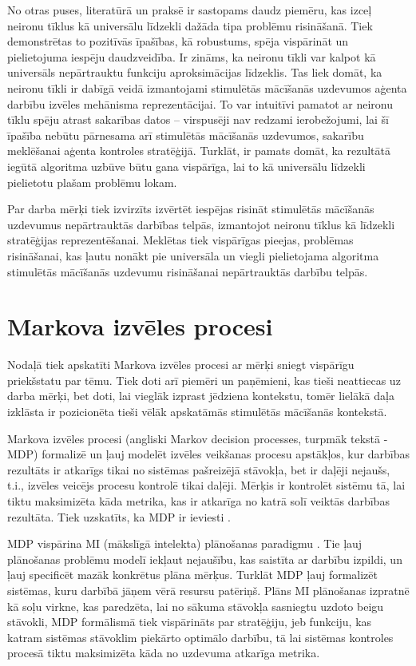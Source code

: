 \documentclass{ludis} %
\begin{document}
No otras puses, literatūrā un praksē ir sastopams daudz piemēru, kas izceļ neironu tīklus kā universālu līdzekli dažāda tipa problēmu risināšanā.
Tiek demonstrētas to pozitīvās īpašības, kā robustums, spēja vispārināt un pielietojuma iespēju daudzveidība.
Ir zināms, ka neironu tīkli var kalpot kā universāls nepārtrauktu funkciju aproksimācijas līdzeklis.
Tas liek domāt, ka neironu tīkli ir dabīgā veidā izmantojami stimulētās mācīšanās uzdevumos aģenta darbību izvēles mehānisma reprezentācijai.
To var intuitīvi pamatot ar neironu tīklu spēju atrast sakarības datos -- virspusēji nav redzami ierobežojumi, lai šī īpašība nebūtu pārnesama arī stimulētās mācīšanās uzdevumos, sakarību meklēšanai aģenta kontroles stratēģijā.
Turklāt, ir pamats domāt, ka rezultātā iegūtā algoritma uzbūve būtu gana vispārīga, lai to kā universālu līdzekli pielietotu plašam problēmu lokam.

Par darba mērķi tiek izvirzīts izvērtēt iespējas risināt stimulētās mācīšanās uzdevumus nepārtrauktās darbības telpās, izmantojot neironu tīklus kā līdzekli stratēģijas reprezentēšanai.
Meklētas tiek vispārīgas pieejas, problēmas risināšanai, kas ļautu nonākt pie universāla un viegli pielietojama algoritma stimulētās mācīšanās uzdevumu risināšanai nepārtrauktās darbību telpās.

\chapter{Markova izvēles procesi} \label{chap:mdp}
Nodaļā tiek apskatīti Markova izvēles procesi ar mērķi sniegt vispārīgu priekšstatu par tēmu.
Tiek doti arī piemēri un paņēmieni, kas tieši neattiecas uz darba mērķi, bet doti, lai vieglāk izprast jēdziena kontekstu, tomēr lielākā daļa izklāsta ir pozicionēta tieši vēlāk apskatāmās stimulētās mācīšanās kontekstā.

Markova izvēles procesi (angliski Markov decision processes, turpmāk tekstā - MDP) formalizē un ļauj modelēt izvēles veikšanas procesu apstākļos, kur darbības rezultāts ir atkarīgs tikai no sistēmas pašreizējā stāvokļa, bet ir daļēji nejaušs, t.i., izvēles veicējs procesu kontrolē tikai daļēji.
Mērķis ir kontrolēt sistēmu tā, lai tiktu maksimizēta kāda metrika, kas ir atkarīga no katrā solī veiktās darbības rezultāta.
Tiek uzskatīts, ka MDP ir ieviesti \autocite{Bel}.

MDP vispārina MI (mākslīgā intelekta) plānošanas paradigmu \autocite{Hendler1990ai}.
Tie ļauj plānošanas problēmu modelī iekļaut nejaušību, kas saistīta ar darbību izpildi, un ļauj specificēt mazāk konkrētus plāna mērķus.
Turklāt MDP ļauj formalizēt sistēmas, kuru darbībā jāņem vērā resursu patēriņš.
Plāns MI plānošanas izpratnē kā soļu virkne, kas paredzēta, lai no sākuma stāvokļa sasniegtu uzdoto beigu stāvokli, MDP formālismā tiek vispārināts par stratēģiju, jeb funkciju, kas katram sistēmas stāvoklim piekārto optimālo darbību, tā lai sistēmas kontroles procesā tiktu maksimizēta kāda no uzdevuma atkarīga metrika.
\end{document}
